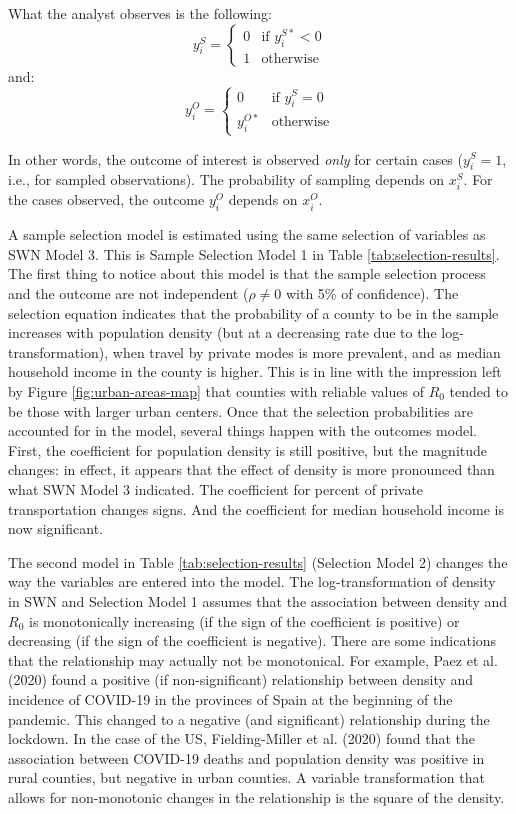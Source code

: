 \documentclass[]{elsarticle} %
\begin{document}
What the analyst observes is the following: \[
y_i^S =
\begin{cases}
0 & \text{if } y_i^{S*} < 0\\
1 & \text{otherwise}
\end{cases}
\] \noindent and: \[
y_i^O =
\begin{cases}
0 & \text{if } y_i^{S} = 0\\
y_i^{O*} & \text{otherwise}
\end{cases}
\]

In other words, the outcome of interest is observed \emph{only} for
certain cases (\(y_i^S=1\), i.e., for sampled observations). The
probability of sampling depends on \(x_i^S\). For the cases observed,
the outcome \(y_i^O\) depends on \(x_i^O\).

A sample selection model is estimated using the same selection of
variables as SWN Model 3. This is Sample Selection Model 1 in Table
\ref{tab:selection-results}. The first thing to notice about this model
is that the sample selection process and the outcome are not independent
(\(\rho\ne0\) with 5\% of confidence). The selection equation indicates
that the probability of a county to be in the sample increases with
population density (but at a decreasing rate due to the
log-transformation), when travel by private modes is more prevalent, and
as median household income in the county is higher. This is in line with
the impression left by Figure \ref{fig:urban-areas-map} that counties
with reliable values of \(R_0\) tended to be those with larger urban
centers. Once that the selection probabilities are accounted for in the
model, several things happen with the outcomes model. First, the
coefficient for population density is still positive, but the magnitude
changes: in effect, it appears that the effect of density is more
pronounced than what SWN Model 3 indicated. The coefficient for percent
of private transportation changes signs. And the coefficient for median
household income is now significant.

The second model in Table \ref{tab:selection-results} (Selection Model
2) changes the way the variables are entered into the model. The
log-transformation of density in SWN and Selection Model 1 assumes that
the association between density and \(R_0\) is monotonically increasing
(if the sign of the coefficient is positive) or decreasing (if the sign
of the coefficient is negative). There are some indications that the
relationship may actually not be monotonical. For example, Paez et al.
(2020) found a positive (if non-significant) relationship between
density and incidence of COVID-19 in the provinces of Spain at the
beginning of the pandemic. This changed to a negative (and significant)
relationship during the lockdown. In the case of the US, Fielding-Miller
et al. (2020) found that the association between COVID-19 deaths and
population density was positive in rural counties, but negative in urban
counties. A variable transformation that allows for non-monotonic
changes in the relationship is the square of the density.
\end{document}

